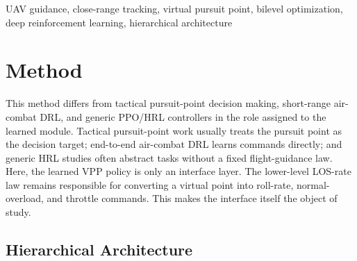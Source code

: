 \documentclass[conference]{IEEEtran}
\begin{document}
\begin{IEEEkeywords}
UAV guidance, close-range tracking, virtual pursuit point, bilevel optimization, deep reinforcement learning, hierarchical architecture
\end{IEEEkeywords}




\section{Method}\label{sec:methods}

This method differs from tactical pursuit-point decision making, short-range air-combat DRL, and generic PPO/HRL controllers in the role assigned to the learned module. Tactical pursuit-point work usually treats the pursuit point as the decision target; end-to-end air-combat DRL learns commands directly; and generic HRL studies often abstract tasks without a fixed flight-guidance law. Here, the learned VPP policy is only an interface layer. The lower-level LOS-rate law remains responsible for converting a virtual point into roll-rate, normal-overload, and throttle commands. This makes the interface itself the object of study.

\subsection{Hierarchical Architecture}\label{sec:hierarchical_architecture}
\end{document}
